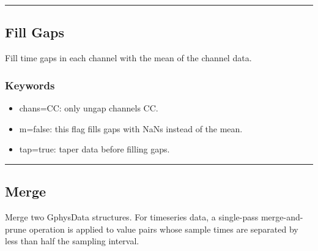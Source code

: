 \documentclass[letterpaper,11pt,english]{sphinxmanual}
\begin{document}
\bigskip\hrule\bigskip



\subsection{Fill Gaps}
\label{\detokenize{src/Processing/processing:fill-gaps}}

\begin{fulllineitems}
\end{fulllineitems}



\begin{fulllineitems}
\end{fulllineitems}


Fill time gaps in each channel with the mean of the channel data.


\subsubsection{Keywords}
\label{\detokenize{src/Processing/processing:id1}}\begin{itemize}
\item {} 
chans=CC: only ungap channels CC.

\item {} 
m=false: this flag fills gaps with NaNs instead of the mean.

\item {} 
tap=true: taper data before filling gaps.

\end{itemize}


\bigskip\hrule\bigskip



\subsection{Merge}
\label{\detokenize{src/Processing/processing:merge}}\label{\detokenize{src/Processing/processing:id2}}

\begin{fulllineitems}
\end{fulllineitems}


Merge two GphysData structures. For timeseries data, a single-pass merge-and-prune
operation is applied to value pairs whose sample times are separated by less than
half the sampling interval.
\end{document}
